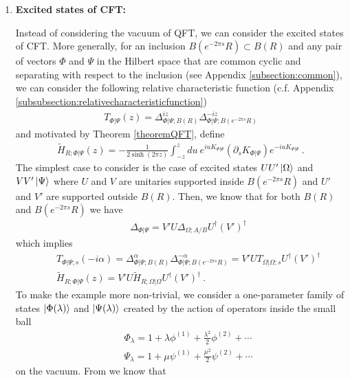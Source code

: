 \documentclass[a4paper,11pt]{article}
\theoremstyle{definition}
\newcommand{\nn}{\nonumber}
\newcommand{\p}{\partial}
\begin{document}
\begin{enumerate}    
 \item {\bf Excited states of CFT:} 

Instead of considering the vacuum of QFT, we can consider the excited states of CFT. More generally, for an inclusion $B(e^{-2\pi s}R)\subset B(R)$ and any pair of vectors $\Phi$ and $\Psi$ in the Hilbert space that are common cyclic and separating with respect to the inclusion (see Appendix \ref{subsection:common}), we can consider the following relative characteristic function (c.f. Appendix \ref{subsubsection:relativecharacteristicfunction})
\begin{eqnarray}
   T_{\Phi|\Psi}(z)=\Delta_{\Phi|\Psi;B(R)}^{iz}\Delta_{\Phi|\Psi;B(e^{-2\pi s}R)}^{-iz}
\end{eqnarray}
and motivated by Theorem \ref{theoremQFT}, define
\begin{eqnarray}
    \tilde{H}_{R;\Phi|\Psi}(z)=-\frac{1}{2\sinh(2\pi z)}\int_{-z}^{z}du\:e^{i u K_{\Phi|\Psi}}(\p_s K_{\Phi|\Psi})e^{-i u K_{\Phi|\Psi}}\ .
\end{eqnarray}
The simplest case to consider is the case of excited states $UU'\ket{\Omega}$ and $VV'\ket{\Psi}$ where $U$ and $V$ are unitaries supported inside $B(e^{-2\pi s}R)$ and $U'$ and $V'$ are supported outside $B(R)$. Then, we know that for both $B(R)$ and $B(e^{-2\pi s}R)$ we have \cite{lashkari2021modular}
\begin{eqnarray}
    &&\Delta_{\Phi|\Psi}=V'U\Delta_{\Omega;A/B}U^\dagger (V')^\dagger
\end{eqnarray}
which implies
\begin{eqnarray}
     &&T_{\Phi|\Psi;s}(-i\alpha)=\Delta_{\Phi|\Psi;B(R)}^{\alpha}\Delta_{\Phi|\Psi;B(e^{-2\pi s}R)}^{-\alpha}=V'U T_{\Omega|\Omega;s} U^\dagger (V')^\dagger\nn\\
     &&\tilde{H}_{R;\Phi|\Psi}(z)=V'U \tilde{H}_{R;\Omega|\Omega}U^\dagger (V')^\dagger\ .
\end{eqnarray}
To make the example more non-trivial, we consider a one-parameter family of states $\ket{\Phi(\lambda)}$ and $\ket{\Psi(\lambda)}$ created by the action of operators inside the small ball
\begin{eqnarray}
    &&\Phi_\lambda=1+\lambda \phi^{(1)}+\frac{\lambda^2}{2}\phi^{(2)}+\cdots\nn\\
    &&\Psi_\lambda=1+\mu\psi^{(1)}+\frac{\mu^2}{2}\psi^{(2)}+\cdots
\end{eqnarray}
on the vacuum. From \cite{lashkari2021modular,lashkari2023perturbation} we know that 

\end{enumerate}
\end{document}
